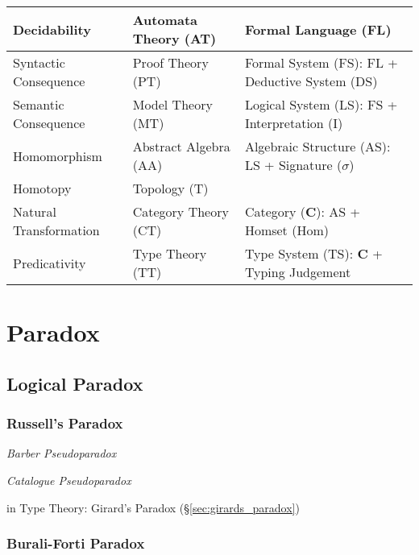 \begin{tabularx}{\textwidth}{| X | X | X |}
    \hline
    Decidability            & Automata Theory (AT)  & Formal Language (FL) \\
    \hline
    Syntactic Consequence   & Proof Theory (PT)     & Formal System (FS): FL + Deductive System (DS) \\
    \hline
    Semantic Consequence    & Model Theory (MT)     & Logical System (LS): FS + Interpretation (I) \\
    \hline
    Homomorphism            & Abstract Algebra (AA) & Algebraic Structure (AS): LS + Signature ($\sigma$) \\
    \hline
    Homotopy                & Topology (T)          & \\
    \hline
    Natural Transformation  & Category Theory (CT)  & Category ($\mathbf{C}$): AS + Homset (Hom) \\
    \hline
    Predicativity           & Type Theory (TT)      & Type System (TS): $\mathbf{C}$ + Typing Judgement \\
    \hline
\end{tabularx}



\section{Paradox}\label{sec:paradox}

\subsection{Logical Paradox}\label{sec:logical_paradox}
\cite{curry77}

\subsubsection{Russell's Paradox}\label{sec:russells_paradox}

\emph{Barber Pseudoparadox}

\emph{Catalogue Pseudoparadox}

in Type Theory: Girard's Paradox (\S\ref{sec:girards_paradox})



\subsubsection{Burali-Forti Paradox}\label{sec:baruliforti_paradox}

